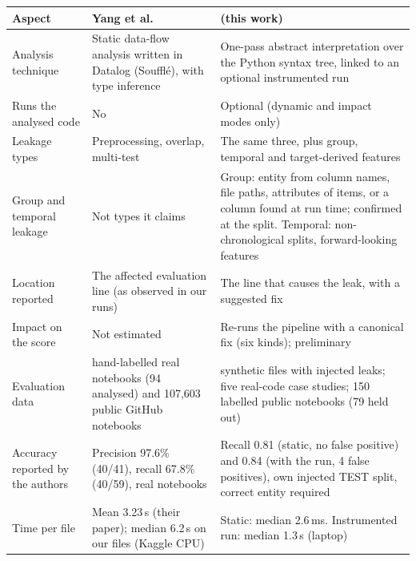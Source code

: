 \begin{tabularx}{\textwidth}{@{}>{\raggedright\arraybackslash}p{}>{\raggedright\arraybackslash}X>{\raggedright\arraybackslash}X@{}}
\toprule
\textbf{Aspect} & \textbf{Yang et al.~\cite{yang2022}} & \textbf{\tool{} (this work)} \\
\midrule
Analysis technique & Static data-flow analysis written in Datalog (Souffl\'{e}), with type inference & One-pass abstract interpretation over the Python syntax tree, linked to an optional instrumented run \\
Runs the analysed code & No & Optional (dynamic and impact modes only) \\
Leakage types & Preprocessing, overlap, multi-test & The same three, plus group, temporal and target-derived features \\
Group and temporal leakage & Not types it claims & Group: entity from column names, file paths, attributes of items, or a column found at run time; confirmed at the split. Temporal: non-chronological splits, forward-looking features \\
Location reported & The affected evaluation line (as observed in our runs) & The line that causes the leak, with a suggested fix \\
Impact on the score & Not estimated & Re-runs the pipeline with a canonical fix (six kinds); preliminary \\
Evaluation data & 100 hand-labelled real notebooks (94 analysed) and 107,603 public GitHub notebooks & 175 synthetic files with injected leaks; five real-code case studies; 150 labelled public notebooks (79 held out) \\
Accuracy reported by the authors & Precision 97.6\% (40/41), recall 67.8\% (40/59), real notebooks & Recall 0.81 (static, no false positive) and 0.84 (with the run, 4 false positives), own injected TEST split, correct entity required \\
Time per file & Mean 3.23\,s (their paper); median 6.2\,s on our files (Kaggle CPU) & Static: median 2.6\,ms. Instrumented run: median 1.3\,s (laptop) \\
\bottomrule
\end{tabularx}

